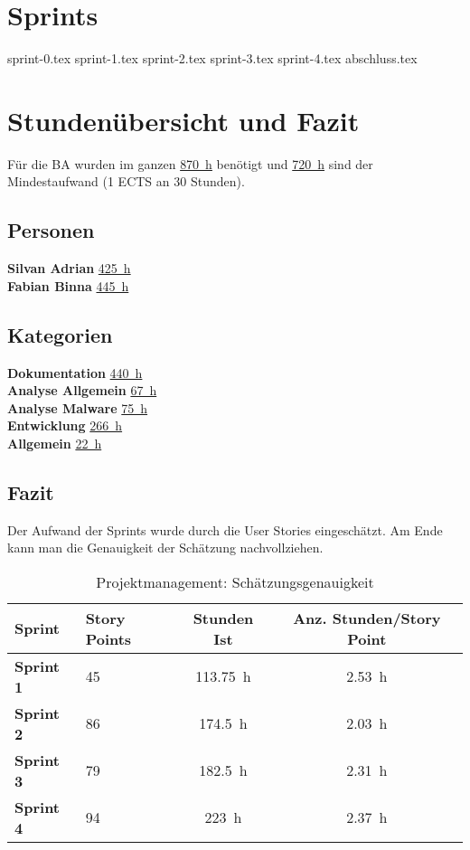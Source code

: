 \newpage
\section{Sprints}
{sprint-0.tex}
\newpage
{sprint-1.tex}
\newpage
{sprint-2.tex}
\newpage
{sprint-3.tex}
\newpage
{sprint-4.tex}
\newpage
{abschluss.tex}
\newpage
\section{Stundenübersicht und Fazit}

Für die BA wurden im ganzen \underline{\SI{870}{\hour}} benötigt und \underline{\SI{720}{\hour}} sind der Mindestaufwand (1 ECTS an 30 Stunden).


\subsection{Personen}

\textbf{Silvan Adrian} \underline{\SI{425}{\hour}} \\
\textbf{Fabian Binna} \underline{\SI{445}{\hour}}

\subsection{Kategorien}

\textbf{Dokumentation} \underline{\SI{440}{\hour}}\\
\textbf{Analyse Allgemein} \underline{\SI{67}{\hour}}\\
\textbf{Analyse Malware} \underline{\SI{75}{\hour}}\\
\textbf{Entwicklung} \underline{\SI{266}{\hour}}\\
\textbf{Allgemein} \underline{\SI{22}{\hour}}\\

\subsection{Fazit}

Der Aufwand der Sprints wurde durch die User Stories eingeschätzt. Am Ende kann man die Genauigkeit der Schätzung nachvollziehen.

\begin{table}[H]
    \centering
	\begin{tabularx}{\textwidth}{l X c c}
       \toprule
        \textbf{Sprint} & \textbf{Story Points} & \textbf{Stunden Ist} & \textbf{Anz. Stunden/Story Point}\\ \hline
  	  \midrule
      \textbf{Sprint 1} & 45 & \SI{113.75}{\hour} & \SI{2.53}{\hour} \\
      \textbf{Sprint 2} & 86 & \SI{174.5}{\hour} & \SI{2.03}{\hour}\\
      \textbf{Sprint 3} & 79 & \SI{182.5}{\hour} & \SI{2.31}{\hour}\\
      \textbf{Sprint 4} & 94 & \SI{223}{\hour} & \SI{2.37}{\hour}\\
	\bottomrule  
    \end{tabularx}
    \caption{Projektmanagement: Schätzungsgenauigkeit}
\end{table}

